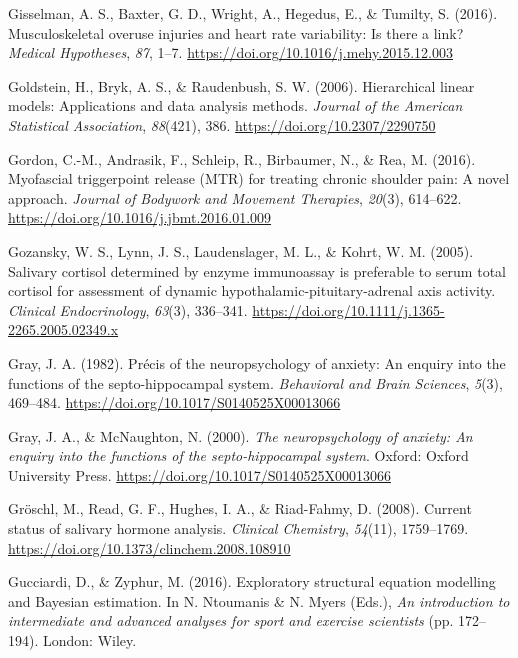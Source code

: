 \documentclass[
  english,
  man,floatsintext]{apa6}
\begin{document}
\leavevmode\hypertarget{ref-Gisselman2016}{}%
Gisselman, A. S., Baxter, G. D., Wright, A., Hegedus, E., \& Tumilty, S. (2016). Musculoskeletal overuse injuries and heart rate variability: Is there a link? \emph{Medical Hypotheses}, \emph{87}, 1--7. \url{https://doi.org/10.1016/j.mehy.2015.12.003}

\leavevmode\hypertarget{ref-Raudenbush2002}{}%
Goldstein, H., Bryk, A. S., \& Raudenbush, S. W. (2006). Hierarchical linear models: Applications and data analysis methods. \emph{Journal of the American Statistical Association}, \emph{88}(421), 386. \url{https://doi.org/10.2307/2290750}

\leavevmode\hypertarget{ref-Gordon2016}{}%
Gordon, C.-M., Andrasik, F., Schleip, R., Birbaumer, N., \& Rea, M. (2016). Myofascial triggerpoint release (MTR) for treating chronic shoulder pain: A novel approach. \emph{Journal of Bodywork and Movement Therapies}, \emph{20}(3), 614--622. \url{https://doi.org/10.1016/j.jbmt.2016.01.009}

\leavevmode\hypertarget{ref-Gozansky2005}{}%
Gozansky, W. S., Lynn, J. S., Laudenslager, M. L., \& Kohrt, W. M. (2005). Salivary cortisol determined by enzyme immunoassay is preferable to serum total cortisol for assessment of dynamic hypothalamic-pituitary-adrenal axis activity. \emph{Clinical Endocrinology}, \emph{63}(3), 336--341. \url{https://doi.org/10.1111/j.1365-2265.2005.02349.x}

\leavevmode\hypertarget{ref-Gray1982a}{}%
Gray, J. A. (1982). Précis of the neuropsychology of anxiety: An enquiry into the functions of the septo-hippocampal system. \emph{Behavioral and Brain Sciences}, \emph{5}(3), 469--484. \url{https://doi.org/10.1017/S0140525X00013066}

\leavevmode\hypertarget{ref-Gray2000}{}%
Gray, J. A., \& McNaughton, N. (2000). \emph{The neuropsychology of anxiety: An enquiry into the functions of the septo-hippocampal system}. Oxford: Oxford University Press. \url{https://doi.org/10.1017/S0140525X00013066}

\leavevmode\hypertarget{ref-Groschl2008}{}%
Gröschl, M., Read, G. F., Hughes, I. A., \& Riad-Fahmy, D. (2008). Current status of salivary hormone analysis. \emph{Clinical Chemistry}, \emph{54}(11), 1759--1769. \url{https://doi.org/10.1373/clinchem.2008.108910}

\leavevmode\hypertarget{ref-Gucci2016}{}%
Gucciardi, D., \& Zyphur, M. (2016). Exploratory structural equation modelling and Bayesian estimation. In N. Ntoumanis \& N. Myers (Eds.), \emph{An introduction to intermediate and advanced analyses for sport and exercise scientists} (pp. 172--194). London: Wiley.
\end{document}

